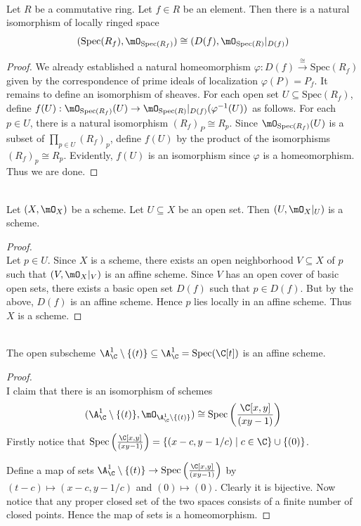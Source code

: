 \documentclass[a4paper]{article}
\begin{document}
\begin{lmm}{}{}\\
Let $R$ be a commutative ring. Let $f\in R$ be an element. Then there is a natural isomorphism of locally ringed space $$(\text{Spec}(R_f),\mO_{\text{Spec}(R_f)})\cong(D(f),\mO_{\text{Spec}(R)}|_{D(f)})$$
\begin{proof}
We already established a natural homeomorphism $\varphi:D(f)\overset{\cong}{\to}\text{Spec}(R_f)$ given by the correspondence of prime ideals of localization $\varphi(P)=P_f$. It remains to define an isomorphism of sheaves. For each open set $U\subseteq\text{Spec}(R_f)$, define $f(U):\mO_{\text{Spec}(R_f)}(U)\to\mO_{\text{Spec}(R)}|_{D(f)}(\varphi^{-1}(U))$ as follows. For each $p\in U$, there is a natural isomorphism $(R_f)_P\cong R_p$. Since $\mO_{\text{Spec}(R_f)}(U)$ is a subset of $\prod_{p\in U}(R_f)_p$, define $f(U)$ by the product of the isomorphisms $(R_f)_p\cong R_p$. Evidently, $f(U)$ is an isomorphism since $\varphi$ is a homeomorphism. Thus we are done. 
\end{proof}
\end{lmm}

\begin{lmm}{}{}\\
Let $(X,\mO_X)$ be a scheme. Let $U\subseteq X$ be an open set. Then $(U,\mO_X|_U)$ is a scheme. 
\begin{proof}\\
Let $p\in U$. Since $X$ is a scheme, there exists an open neighborhood $V\subseteq X$ of $p$ such that $(V,\mO_X|_V)$ is an affine scheme. Since $V$ has an open cover of basic open sets, there exists a basic open set $D(f)$ such that $p\in D(f)$. But by the above, $D(f)$ is an affine scheme. Hence $p$ lies locally in an affine scheme. Thus $X$ is a scheme. 
\end{proof}
\end{lmm}

\begin{eg}{}{}\\
The open subscheme $\A_\C^1\setminus\{(t)\}\subseteq\A_\C^1=\text{Spec}(\C[t])$ is an affine scheme. 
\begin{proof}\\
I claim that there is an isomorphism of schemes $$(\A_\C^1\setminus\{(t)\},\mO_{\A_\C^1\setminus\{(t)\}})\cong\text{Spec}\left(\frac{\C[x,y]}{(xy-1)}\right)$$ Firstly notice that $\text{Spec}\left(\frac{\C[x,y]}{(xy-1)}\right)=\{(x-c,y-1/c)\;|\;c\in\C\}\cup\{(0)\}$. 

Define a map of sets $\A_\C^1\setminus\{(t)\}\to\text{Spec}\left(\frac{\C[x,y]}{(xy-1)}\right)$ by $(t-c)\mapsto(x-c,y-1/c)$ and $(0)\mapsto(0)$. Clearly it is bijective. Now notice that any proper closed set of the two spaces consists of a finite number of closed points. Hence the map of sets is a homeomorphism. 
\end{proof}
\end{eg}
\end{document}
